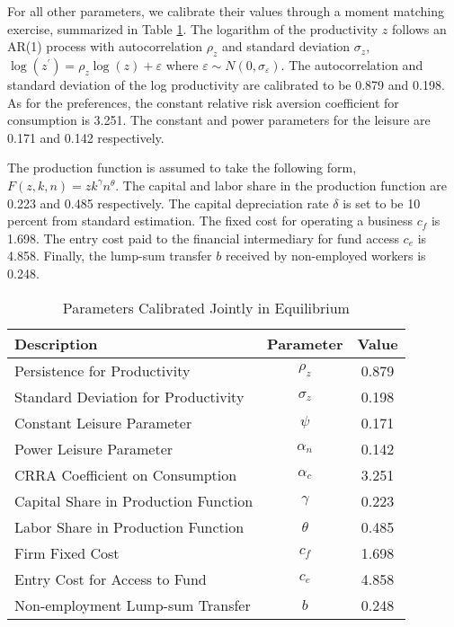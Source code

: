 \documentclass[12pt]{article}
\begin{document}
For all other parameters, we calibrate their values through a moment
matching exercise, summarized in Table \ref{tab_para2}. The logarithm of the productivity $z$ follows an AR(1) process with
autocorrelation $\rho_z$ and standard deviation $\sigma_z$, $%
\log(z^{\prime})=\rho_z\log(z)+\varepsilon$ where $\varepsilon\sim
N(0,\sigma_\varepsilon)$. The autocorrelation and standard deviation of the log productivity are calibrated to be 0.879 and 0.198. As for the preferences, the constant relative risk aversion coefficient for consumption is 3.251. The constant and power parameters for the leisure are 0.171 and 0.142 respectively. 

The production function is assumed to take the following form, $F(z,k,n)=zk^\gamma n^\theta$. The capital and labor share in the production function are 0.223 and 0.485
respectively. The capital depreciation rate $\delta$ is set to be 10 percent from
standard estimation. The fixed cost for operating a business $c_f$ is 1.698. The entry
cost paid to the financial intermediary for fund access $c_e$ is 4.858. Finally, the
lump-sum transfer $b$ received by non-employed workers is 0.248.

\begin{table}[!ht]
\caption{\sc Parameters Calibrated Jointly in Equilibrium}
\label{tab_para2}
\begin{center}
\begin{tabular}{lcc}
\hline\hline
Description &  Parameter &      Value \\
\hline
Persistence for Productivity &   $\rho_z$ &      0.879 \\

Standard Deviation for Productivity & $\sigma_z$ &      0.198 \\

Constant Leisure Parameter  &   $\psi$ &      0.171 \\

Power Leisure Parameter  & $\alpha_n$ &      0.142 \\

CRRA Coefficient on Consumption & $\alpha_c$ &      3.251 \\

Capital Share in Production Function&   $\gamma$ &      0.223 \\

Labor Share in Production Function&   $\theta$ &      0.485 \\

Firm Fixed Cost &      $c_f$ &      1.698 \\

Entry Cost for Access to Fund &      $c_e$ &      4.858 \\

Non-employment Lump-sum Transfer &        $b$ &      0.248 \\
\hline\hline
\end{tabular}  
\end{center}
\end{table}
\end{document}

